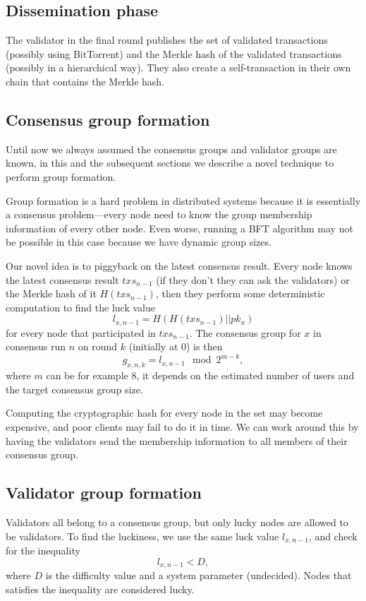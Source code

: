 \subsection{Dissemination phase}
The validator in the final round publishes the set of validated transactions
(possibly using BitTorrent) and the Merkle hash of the validated transactions
(possibly in a hierarchical way). They also create a self-transaction in their
own chain that contains the Merkle hash.

\subsection{Consensus group formation}\label{sec:consensus-group}
Until now we always assumed the consensus groups and validator groups are known,
in this and the subsequent sections we describe a novel technique to perform
group formation.

Group formation is a hard problem in distributed systems because it is
essentially a consensus problem---every node need to know the group membership
information of every other node. Even worse, running a BFT algorithm may not be
possible in this case because we have dynamic group sizes.

Our novel idea is to piggyback on the latest consensus result. Every node knows
the latest consensus result $txs_{n-1}$ (if they don't they can ask the
validators) or the Merkle hash of it $H(txs_{n-1})$, then they perform some
deterministic computation to find the luck value
$$l_{x,n-1} = H(H(txs_{n-1}) || pk_{x})$$
for every node that participated in $txs_{n-1}$. The consensus group for $x$ in
consensus run $n$ on round $k$ (initially at 0) is then
$$
g_{x,n,k} = l_{x, n-1} \mod 2^{m-k},
$$
where $m$ can be for example 8, it depends on the estimated number of users
and the target consensus group size.

Computing the cryptographic hash for every node in the set may become expensive,
and poor clients may fail to do it in time. We can work around this by having
the validators send the membership information to all members of their consensus
group.

\subsection{Validator group formation}\label{sec:validator-group}
Validators all belong to a consensus group, but only lucky nodes are allowed to
be validators. To find the luckiness, we use the same luck value $l_{x,n-1}$,
and check for the inequality
$$
l_{x, n-1} < D,
$$
where $D$ is the difficulty value and a system parameter (undecided). Nodes that
satisfies the inequality are considered lucky.

